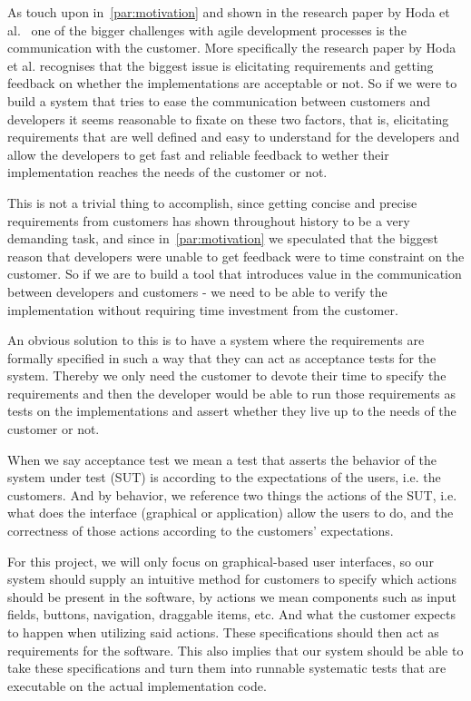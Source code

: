 As touch upon in~\autoref{par:motivation} and shown in the research paper by Hoda et al.~\cite{Hoda2011TheIO} one of the bigger challenges with agile development processes is the communication with the customer.
More specifically the research paper by Hoda et al. recognises that the biggest issue is elicitating requirements and getting feedback on whether the implementations are acceptable or not.
So if we were to build a system that tries to ease the communication between customers and developers it seems reasonable to fixate on these two factors, that is, elicitating requirements that are well defined and easy to understand for the developers and allow the developers to get fast and reliable feedback to wether their implementation reaches the needs of the customer or not.

This is not a trivial thing to accomplish, since getting concise and precise requirements from customers has shown throughout history to be a very demanding task, and since in~\autoref{par:motivation} we speculated that the biggest reason that developers were unable to get feedback were to time constraint on the customer.
So if we are to build a tool that introduces value in the communication between developers and customers - we need to be able to verify the implementation without requiring time investment from the customer.

An obvious solution to this is to have a system where the requirements are formally specified in such a way that they can act as acceptance tests for the system.
Thereby we only need the customer to devote their time to specify the requirements and then the developer would be able to run those requirements as tests on the implementations and assert whether they live up to the needs of the customer or not.

When we say acceptance test we mean a test that asserts the behavior of the system under test (SUT) is according to the expectations of the users, i.e. the customers.
And by behavior, we reference two things the actions of the SUT, i.e. what does the interface (graphical or application) allow the users to do, and the correctness of those actions according to the customers' expectations.

For this project, we will only focus on graphical-based user interfaces, so our system should supply an intuitive method for customers to specify which actions should be present in the software, by actions we mean components such as input fields, buttons, navigation, draggable items, etc.
And what the customer expects to happen when utilizing said actions.
These specifications should then act as requirements for the software.
This also implies that our system should be able to take these specifications and turn them into runnable systematic tests that are executable on the actual implementation code.

